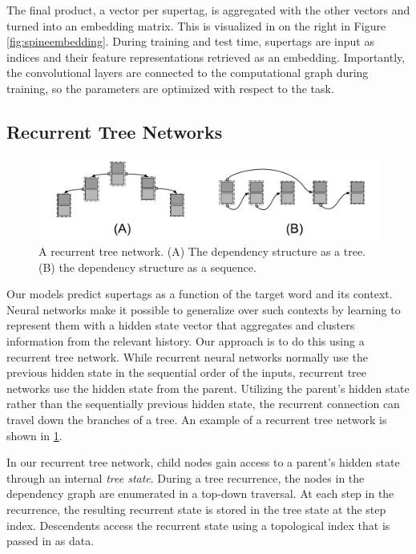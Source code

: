 \documentclass[11pt]{article}
\begin{document}
The final product, a vector per supertag, is aggregated with the other vectors
and turned into an embedding matrix.
%
This is visualized in on the right in Figure \ref{fig:spineembedding}.
%
During training and test time, supertags are input as indices and their feature
representations retrieved as an embedding.
%
Importantly, the convolutional layers are connected to the computational graph during training, so the parameters are optimized with respect to the task.


\subsection{Recurrent Tree Networks}
\label{subsec:rtn}

\begin{figure}[tH!]
\centering
\includegraphics[width=\textwidth]{rtn.pdf}
\caption{A recurrent tree network. (A) The dependency structure as a tree.  (B) the dependency structure as a sequence.}
 \label{fig:rtn}
\end{figure}

Our models predict supertags as a function of the target word and its
context.  Neural networks make it possible to generalize over such
contexts by learning to represent them with a hidden state vector that
aggregates and clusters information from the relevant history.  Our
approach is to do this using a recurrent tree network.
%
While recurrent neural networks normally use the previous hidden state in the sequential order of the inputs,
recurrent tree networks use the hidden state from the parent.
%
Utilizing the parent's hidden state rather than the sequentially previous hidden
state, the recurrent connection can travel down the branches of a tree.
%
An example of a recurrent tree network is shown in \ref{fig:rtn}.



In our recurrent tree network, child nodes gain access to a parent's hidden state
through an internal \emph{tree state}.
%
During a tree recurrence, the nodes in the dependency graph are enumerated in a
top-down traversal.
%
At each step in the recurrence, the resulting recurrent state is stored in the
tree state at the step index.
%
Descendents access the recurrent state using a topological index that is passed in as data.
\end{document}
